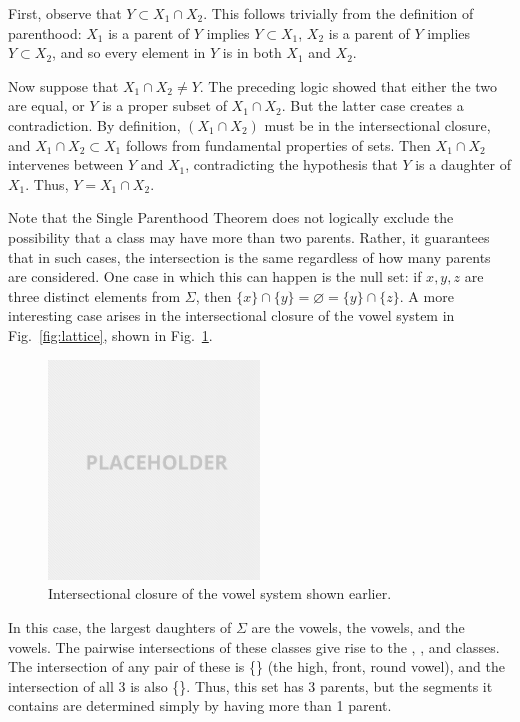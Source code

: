 \documentclass[11pt, oneside]{article}   	%
\begin{document}
First, observe that $Y \subset X_1 \cap X_2$. This follows trivially from the definition of parenthood: $X_1$ is a parent of $Y$ implies $Y \subset X_1$, $X_2$ is a parent of $Y$ implies $Y \subset X_2$, and so every element in $Y$ is in both $X_1$ and $X_2$.

Now suppose that $X_1 \cap X_2 \neq Y$. The preceding logic showed that either the two are equal, or $Y$ is a proper subset of $X_1 \cap X_2$. But the latter case creates a contradiction. By definition, $(X_1 \cap X_2)$ must be in the intersectional closure, and $X_1 \cap X_2 \subset X_1$ follows from fundamental properties of sets. Then $X_1 \cap X_2$ intervenes between $Y$ and $X_1$, contradicting the hypothesis that $Y$ is a daughter of $X_1$. Thus, $Y = X_1 \cap X_2$.
	
\vspace{\baselineskip} Note that the Single Parenthood Theorem does not logically exclude the possibility that a class may have more than two parents. Rather, it guarantees that in such cases, the intersection is the same regardless of how many parents are considered. One case in which this can happen is the null set: if $x, y, z$ are three distinct elements from $\Sigma$, then $\{ x \} \cap \{ y \} = \varnothing = \{ y \} \cap \{ z \}$. A more interesting case arises in the intersectional closure of the vowel system in Fig.~\ref{fig:lattice}, shown in Fig.~\ref{fig:closure}. 

\begin{figure}[h]
  \centering
  \includegraphics[width=0.5\textwidth]{placeholder.png}
  \caption{Intersectional closure of the vowel system shown earlier.}
  \label{fig:closure}
\end{figure}

In this case, the largest daughters of $\Sigma$ are the  vowels, the  vowels, and the  vowels. The pairwise intersections of these classes give rise to the , , and  classes. The intersection of any pair of these is \{\} (the high, front, round vowel), and the intersection of all 3 is also \{\}. Thus, this set has 3 parents, but the segments it contains are determined simply by having more than 1 parent.
\end{document}
